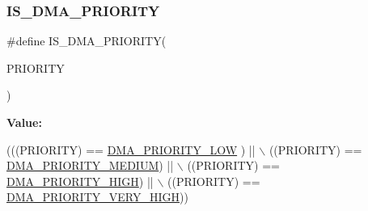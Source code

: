 \subsubsection{\texorpdfstring{I\+S\+\_\+\+D\+M\+A\+\_\+\+P\+R\+I\+O\+R\+I\+TY}{IS\_DMA\_PRIORITY}}
{\footnotesize\ttfamily \#define I\+S\+\_\+\+D\+M\+A\+\_\+\+P\+R\+I\+O\+R\+I\+TY(\begin{DoxyParamCaption}\item[{}]{P\+R\+I\+O\+R\+I\+TY }\end{DoxyParamCaption})}

{\bfseries Value\+:}
\begin{DoxyCode}
(((PRIORITY) == \mbox{\hyperlink{group___d_m_a___priority__level_ga0d1ed2bc9229ba3c953002bcf3a72130}{DMA\_PRIORITY\_LOW}} )   || \(\backslash\)
                                   ((PRIORITY) == \mbox{\hyperlink{group___d_m_a___priority__level_gad6fbeee76fd4a02cbed64365bb4c1781}{DMA\_PRIORITY\_MEDIUM}}) || \(\backslash\)
                                   ((PRIORITY) == \mbox{\hyperlink{group___d_m_a___priority__level_ga6b2f5c5e22895f8b4bd52a27ec6cae2a}{DMA\_PRIORITY\_HIGH}})   || \(\backslash\)
                                   ((PRIORITY) == \mbox{\hyperlink{group___d_m_a___priority__level_gaed0542331a4d875d1d8d5b2878e9372c}{DMA\_PRIORITY\_VERY\_HIGH}}))
\end{DoxyCode}
